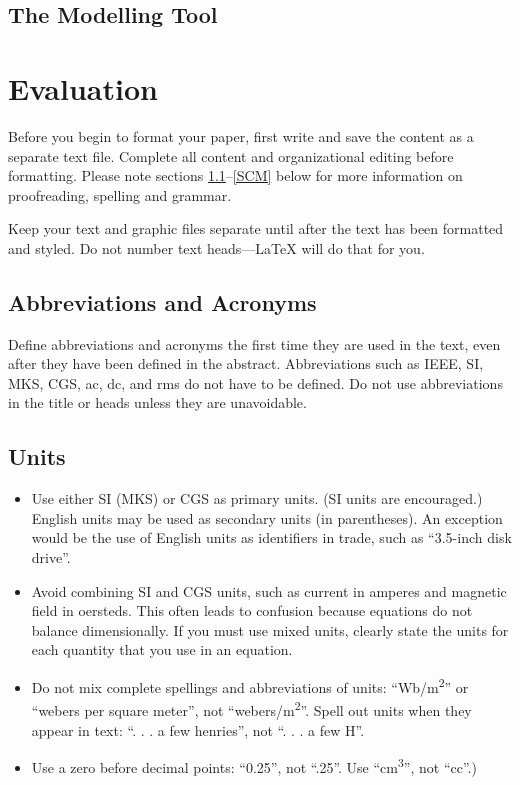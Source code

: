 \documentclass[conference]{IEEEtran}
\begin{document}
\subsection{The Modelling Tool}
\section{Evaluation}
Before you begin to format your paper, first write and save the content as a 
separate text file. Complete all content and organizational editing before 
formatting. Please note sections \ref{AA}--\ref{SCM} below for more information on 
proofreading, spelling and grammar.

Keep your text and graphic files separate until after the text has been 
formatted and styled. Do not number text heads---{\LaTeX} will do that 
for you.

\subsection{Abbreviations and Acronyms}\label{AA}
Define abbreviations and acronyms the first time they are used in the text, 
even after they have been defined in the abstract. Abbreviations such as 
IEEE, SI, MKS, CGS, ac, dc, and rms do not have to be defined. Do not use 
abbreviations in the title or heads unless they are unavoidable.

\subsection{Units}
\begin{itemize}
\item Use either SI (MKS) or CGS as primary units. (SI units are encouraged.) English units may be used as secondary units (in parentheses). An exception would be the use of English units as identifiers in trade, such as ``3.5-inch disk drive''.
\item Avoid combining SI and CGS units, such as current in amperes and magnetic field in oersteds. This often leads to confusion because equations do not balance dimensionally. If you must use mixed units, clearly state the units for each quantity that you use in an equation.
\item Do not mix complete spellings and abbreviations of units: ``Wb/m\textsuperscript{2}'' or ``webers per square meter'', not ``webers/m\textsuperscript{2}''. Spell out units when they appear in text: ``. . . a few henries'', not ``. . . a few H''.
\item Use a zero before decimal points: ``0.25'', not ``.25''. Use ``cm\textsuperscript{3}'', not ``cc''.)
\end{itemize}
\end{document}
